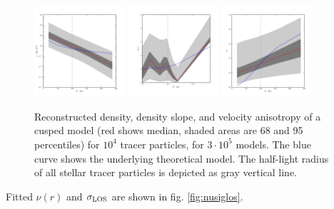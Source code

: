 \begin{figure}
    \begin{center}
        \hspace{-7mm}
        \includegraphics[width=0.3\textwidth]{fig/prof_dens.png}
        \includegraphics[width=0.3\textwidth]{fig/prof_nr.png}
        \includegraphics[width=0.3\textwidth]{fig/prof_betastar1.png}
        \caption{Reconstructed density, density slope, and velocity
          anisotropy of a cusped model (red shows median, shaded areas
          are 68 and 95 percentiles) for $10^4$ tracer particles, for
          $3\cdot10^5$ models. The blue curve shows the underlying
          theoretical model. The half-light radius of all stellar
          tracer particles is depicted as gray vertical line.}
        \label{fig:cusp}
    \end{center}
\end{figure}


Fitted $\nu(r)$ and $\sigma_{\text{LOS}}$ are shown in fig. \ref{fig:nusiglos}.

